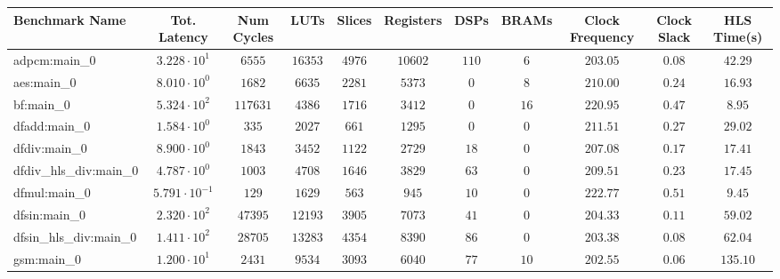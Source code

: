 \begin{tabular}{|l|c|c|c|c|c|c|c|c|c|c|}
\hline
Benchmark Name          & Tot. Latency            & Num Cycles & LUTs       & Slices    & Registers & DSPs    & BRAMs   & Clock Frequency & Clock Slack & HLS Time(s) \\
\hline
adpcm:main\_0           & $ 3.228 \cdot 10^{1}  $ & $ 6555   $ & $ 16353  $ & $ 4976  $ & $ 10602 $ & $ 110 $ & $ 6   $ & $ 203.05      $ & $ 0.08    $ & $ 42.29   $ \\
aes:main\_0             & $ 8.010 \cdot 10^{0}  $ & $ 1682   $ & $ 6635   $ & $ 2281  $ & $ 5373  $ & $ 0   $ & $ 8   $ & $ 210.00      $ & $ 0.24    $ & $ 16.93   $ \\
bf:main\_0              & $ 5.324 \cdot 10^{2}  $ & $ 117631 $ & $ 4386   $ & $ 1716  $ & $ 3412  $ & $ 0   $ & $ 16  $ & $ 220.95      $ & $ 0.47    $ & $ 8.95    $ \\
dfadd:main\_0           & $ 1.584 \cdot 10^{0}  $ & $ 335    $ & $ 2027   $ & $ 661   $ & $ 1295  $ & $ 0   $ & $ 0   $ & $ 211.51      $ & $ 0.27    $ & $ 29.02   $ \\
dfdiv:main\_0           & $ 8.900 \cdot 10^{0}  $ & $ 1843   $ & $ 3452   $ & $ 1122  $ & $ 2729  $ & $ 18  $ & $ 0   $ & $ 207.08      $ & $ 0.17    $ & $ 17.41   $ \\
dfdiv\_hls\_div:main\_0 & $ 4.787 \cdot 10^{0}  $ & $ 1003   $ & $ 4708   $ & $ 1646  $ & $ 3829  $ & $ 63  $ & $ 0   $ & $ 209.51      $ & $ 0.23    $ & $ 17.45   $ \\
dfmul:main\_0           & $ 5.791 \cdot 10^{-1} $ & $ 129    $ & $ 1629   $ & $ 563   $ & $ 945   $ & $ 10  $ & $ 0   $ & $ 222.77      $ & $ 0.51    $ & $ 9.45    $ \\
dfsin:main\_0           & $ 2.320 \cdot 10^{2}  $ & $ 47395  $ & $ 12193  $ & $ 3905  $ & $ 7073  $ & $ 41  $ & $ 0   $ & $ 204.33      $ & $ 0.11    $ & $ 59.02   $ \\
dfsin\_hls\_div:main\_0 & $ 1.411 \cdot 10^{2}  $ & $ 28705  $ & $ 13283  $ & $ 4354  $ & $ 8390  $ & $ 86  $ & $ 0   $ & $ 203.38      $ & $ 0.08    $ & $ 62.04   $ \\
gsm:main\_0             & $ 1.200 \cdot 10^{1}  $ & $ 2431   $ & $ 9534   $ & $ 3093  $ & $ 6040  $ & $ 77  $ & $ 10  $ & $ 202.55      $ & $ 0.06    $ & $ 135.10  $ \\

\end{tabular}
